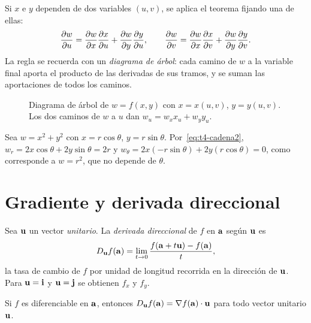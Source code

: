 Si $x$ e $y$ dependen de dos variables $(u,v)$, se aplica el teorema fijando una de ellas:
\begin{equation}\label{eq:t4-cadena2}
\frac{\partial w}{\partial u}=\frac{\partial w}{\partial x}\frac{\partial x}{\partial u}+\frac{\partial w}{\partial y}\frac{\partial y}{\partial u},\qquad \frac{\partial w}{\partial v}=\frac{\partial w}{\partial x}\frac{\partial x}{\partial v}+\frac{\partial w}{\partial y}\frac{\partial y}{\partial v} .
\end{equation}
La regla se recuerda con un \emph{diagrama de árbol}: cada camino de $w$ a la variable final aporta el producto de las derivadas de sus tramos, y se suman las aportaciones de todos los caminos.

\begin{figure}[ht]
\centering
{}
\caption{Diagrama de árbol de $w=f(x,y)$ con $x=x(u,v)$, $y=y(u,v)$. Los dos caminos de $w$ a $u$ dan $w_u=w_xx_u+w_yy_u$.}
\label{fig:t4-arbol}
\end{figure}

\begin{ejemplo}\label{ej:t4-polares}
Sea $w=x^2+y^2$ con $x=r\cos\theta$, $y=r\sin\theta$. Por~\eqref{eq:t4-cadena2}, $w_r=2x\cos\theta+2y\sin\theta=2r$ y $w_\theta=2x(-r\sin\theta)+2y(r\cos\theta)=0$, como corresponde a $w=r^2$, que no depende de $\theta$.
\end{ejemplo}

\section{Gradiente y derivada direccional}

\begin{definicion}\label{def:direccional}
Sea $\mathbf{u}$ un vector \emph{unitario}. La \emph{derivada direccional} de $f$ en $\mathbf{a}$ según $\mathbf{u}$ es
\[
D_{\mathbf{u}}f(\mathbf{a})=\lim_{t\to0}\frac{f(\mathbf{a}+t\mathbf{u})-f(\mathbf{a})}{t},
\]
la tasa de cambio de $f$ por unidad de longitud recorrida en la dirección de $\mathbf{u}$. Para $\mathbf{u}=\mathbf{i}$ y $\mathbf{u}=\mathbf{j}$ se obtienen $f_x$ y $f_y$.
\end{definicion}

\begin{teorema}\label{teo:direccional}
Si $f$ es diferenciable en $\mathbf{a}$, entonces $D_{\mathbf{u}}f(\mathbf{a})=\nabla f(\mathbf{a})\cdot\mathbf{u}$ para todo vector unitario $\mathbf{u}$.
\end{teorema}

